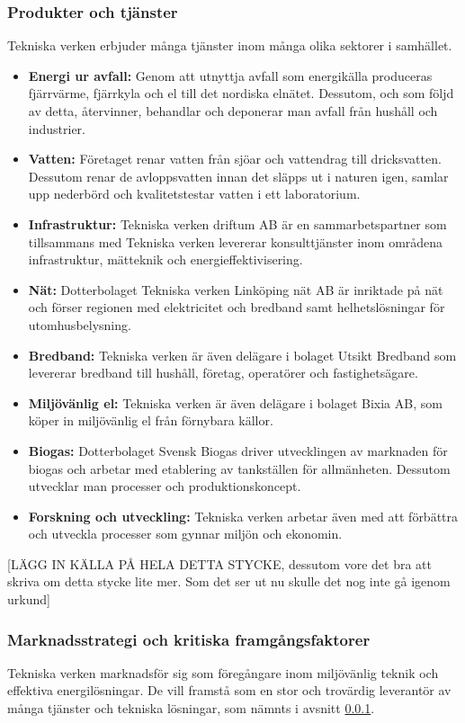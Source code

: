 \documentclass[10pt,a4paper]{article}
\begin{document}
\subsubsection{Produkter och tjänster} \label{subsec:prod}
Tekniska verken erbjuder många tjänster inom många olika sektorer i samhället.
\begin{itemize}
	\item \textbf{Energi ur avfall:} Genom att utnyttja avfall som energikälla
	produceras fjärrvärme, fjärrkyla och el till det nordiska elnätet. Dessutom, och
	som följd av detta, återvinner, behandlar och deponerar man avfall från hushåll
	och industrier.
	\item \textbf{Vatten:} Företaget renar vatten från sjöar och vattendrag till
	dricksvatten. Dessutom renar de avloppsvatten innan det släpps ut i naturen igen, samlar
	upp nederbörd och kvalitetstestar vatten i ett laboratorium.
	\item \textbf{Infrastruktur:} Tekniska verken driftum AB är en sammarbetspartner
	som tillsammans med Tekniska verken levererar konsulttjänster inom områdena infrastruktur,
	mätteknik och energieffektivisering.
	\item \textbf{Nät:} Dotterbolaget Tekniska verken Linköping nät AB är
	inriktade på nät och förser regionen med elektricitet och bredband samt
	helhetslösningar för utomhusbelysning.
	\item \textbf{Bredband:} Tekniska verken är även delägare i bolaget Utsikt
	Bredband som levererar bredband till hushåll, företag, operatörer och fastighetsägare.
	\item \textbf{Miljövänlig el:} Tekniska verken är även delägare i bolaget Bixia
	AB, som köper in miljövänlig el från förnybara källor.
	\item \textbf{Biogas:} Dotterbolaget Svensk Biogas driver utvecklingen av
	marknaden för biogas och arbetar med etablering av tankställen för allmänheten.
	Dessutom utvecklar man processer och produktionskoncept.
	\item \textbf{Forskning och utveckling:} Tekniska verken arbetar även med att
	förbättra och utveckla processer som gynnar miljön och ekonomin.
\end{itemize}

[LÄGG IN KÄLLA PÅ HELA DETTA STYCKE, dessutom vore det bra att skriva om detta stycke lite mer. Som det ser ut nu skulle det nog inte gå igenom urkund]

\subsubsection{Marknadsstrategi och kritiska framgångsfaktorer} \label{subsec:kff}
Tekniska verken marknadsför sig som föregångare inom miljövänlig teknik och
effektiva energilösningar. De vill framstå som en stor och trovärdig leverantör 
av många tjänster och tekniska lösningar, som nämnts i avsnitt \ref{subsec:prod}. 
\end{document}
